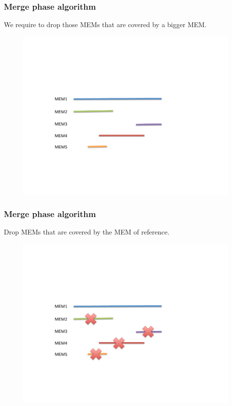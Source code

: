 \documentclass{beamer}
\begin{document}
\begin{frame}
  \frametitle{Merge phase algorithm}
  \begin{block}{}
    We require to drop those MEMs that are covered by a bigger MEM.
  \end{block}
  \begin{figure}\includegraphics[scale=0.3]{merge.pdf}\end{figure}
\end{frame}
\begin{frame}
  \frametitle{Merge phase algorithm}
  \begin{block}{}
    Drop MEMs that are covered by the MEM of reference.
  \end{block}
  \begin{figure}\includegraphics[scale=0.3]{case3.pdf}\end{figure}
\end{frame}
\end{document}
